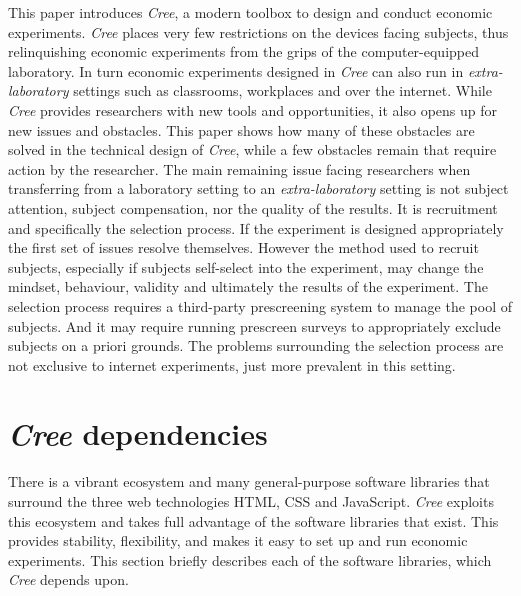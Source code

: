 \documentclass[preprint, 12pt]{elsarticle}
\newcommand{\Cree}{\emph{Cree}\xspace}
\begin{document}
This paper introduces \Cree, a modern toolbox to design and conduct economic experiments. \Cree places very few restrictions on the devices facing subjects, thus relinquishing economic experiments from the grips of the computer-equipped laboratory. In turn economic experiments designed in \Cree can also run in \emph{extra-laboratory} settings such as classrooms, workplaces and over the internet. While \Cree provides researchers with new tools and opportunities, it also opens up for new issues and obstacles. This paper shows how many of these obstacles are solved in the technical design of \Cree, while a few obstacles remain that require action by the researcher. The main remaining issue facing researchers when transferring from a laboratory setting to an \emph{extra-laboratory} setting is not subject attention, subject compensation, nor the quality of the results. It is recruitment and specifically the selection process. If the experiment is designed appropriately the first set of issues resolve themselves. However the method used to recruit subjects, especially if subjects self-select into the experiment, may change the mindset, behaviour, validity and ultimately the results of the experiment. The selection process requires a third-party prescreening system to manage the pool of subjects. And it may require running prescreen surveys to appropriately exclude subjects on a priori grounds. The problems surrounding the selection process are not exclusive to internet experiments, just more prevalent in this setting.

\newpage

\appendix

\section{\Cree dependencies}
\label{S:dependencies}

There is a vibrant ecosystem and many general-purpose software libraries that surround the three web technologies HTML, CSS and JavaScript. \Cree exploits this ecosystem and takes full advantage of the software libraries that exist. This provides stability, flexibility, and makes it easy to set up and run economic experiments. This section briefly describes each of the software libraries, which \Cree depends upon.
\end{document}
